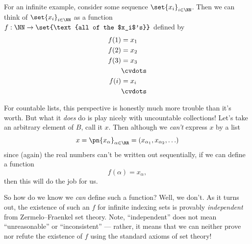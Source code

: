 \documentclass{fkpset}
\begin{document}
\begin{solution}
\begin{leftbar}
\begin{note}
{          For an infinite example, consider some sequence
          $\set{x_i}_{i \in \NN}$. Then we can think of $\set{x_i}_{i
            \in \NN}$ as a function $f : \NN \to \set{\text{all of the
              $x_i$'s}}$ defined by
          \begin{align*}
            f(1) &= x_1 \\
            f(2) &= x_2 \\
            f(3) &= x_3 \\
                 &\cvdots \\
            f(i) &= x_i \\
                 &\cvdots
          \end{align*}
        }
        \vspace{-3\parskip}

        {\color{ProcessBlue}
          For countable lists, this perspective is honestly much more
          trouble than it's worth. But what it \emph{does} do is play
          nicely with uncountable collections! Let's take an arbitrary
          element of $B$, call it $x$. Then although we \emph{can't}
          express $x$ by a list
          \[
            x = \pn{x_\alpha}_{\alpha \in \RR} = (x_{\alpha_1},
            x_{\alpha_2}, \ldots)
          \]
          since (again) the real numbers can't be written out
          sequentially, if we can define a function
          \[
            f(\alpha) = x_{\alpha},
          \]
          then this will do the job for us.
        }

        {\color{Plum}
          So how do we know we \emph{can} define such a function?
          Well, we don't. As it turns out, the existence of such an
          $f$ for infinite indexing sets is provably
          \emph{independent} from Zermelo–Fraenkel set theory. Note,
          ``independent'' does not mean ``unreasonable'' or
          ``inconsistent'' --- rather, it means that we can neither
          prove nor refute the existence of $f$ using the standard
          axioms of set theory!
        }


\end{note}
\end{leftbar}
\end{solution}
\end{document}

